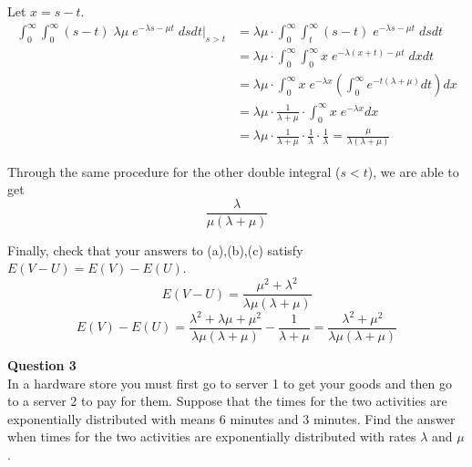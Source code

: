 \documentclass[12pt]{article}
\begin{document}
\begin{enumerate}[label=(\alph*)]
\begin{itemize}
            \vspace{1\baselineskip}
            Let $x= s-t$.
        \begin{align}
            \int_0^\infty \int_0^\infty (s-t)\; \lambda \mu\; e^{-\lambda s -\mu t} \;dsdt \rvert_{ s>t } &= \lambda\mu\cdot\int_0^\infty \int_t^\infty (s-t)\;e^{-\lambda s -\mu t} \;dsdt \nonumber \\
            &= \lambda\mu\cdot\int_0^\infty \int_0^\infty x\;e^{-\lambda (x+t) -\mu t} \;dxdt  \nonumber\\ \nonumber
            &= \lambda\mu\cdot \int_0^\infty x\;e^{-\lambda x}\left(\int_0^\infty e^{-t(\lambda +\mu)}dt \right)dx      \\ \nonumber
            &=\lambda\mu\cdot\frac{1}{\lambda+\mu} \cdot \int_0^\infty x\;e^{-\lambda x}dx\\ \nonumber
            &=\lambda\mu\cdot\frac{1}{\lambda+\mu}\cdot\frac{1}{\lambda}\cdot \frac{1}{\lambda}
            =\frac{\mu}{\lambda(\lambda+\mu)}  \nonumber
        \end{align}
        
           Through the same procedure for the other double integral ($s<t$), we are able to get 
           $$\frac{\lambda}{\mu(\lambda+\mu)}$$
    \end{itemize}
    
    
\end{enumerate}
Finally, check that your answers to (a),(b),(c) satisfy $E(V-U) = E(V)-E(U)$.
$$E(V-U) = \frac{\mu^2+\lambda^2}{\lambda\mu(\lambda+\mu)}$$
$$E(V)-E(U) = \frac{\lambda^2+\lambda\mu+\mu^2}{\lambda\mu(\lambda+\mu)} - \frac{1}{\lambda+\mu}
=\frac{\lambda^2+\mu^2}{\lambda\mu(\lambda+\mu)}$$

\newpage
\textbf{Question 3}\\
In a hardware store you must first go to server 1 to get your goods and then go to a server 2 to pay for them. Suppose that the times for the two activities are exponentially distributed with means 6 minutes and 3 minutes. Find the answer when times for the two activities are exponentially distributed with rates $\lambda$ and $\mu$.
\end{document}
